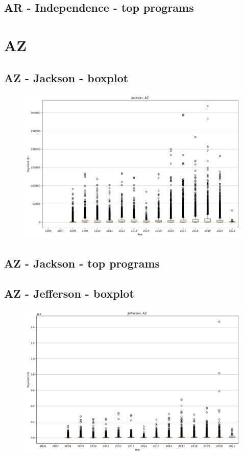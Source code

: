 \subsection*{AR - Independence - top programs}

\newpage
\section*{AZ}
\subsection*{AZ - Jackson - boxplot}
\begin{figure}[h]
\centering
\includegraphics[width=7in]{../output/boxplots/counties/Jackson-AZ_boxplot.png}
\end{figure}


\subsection*{AZ - Jackson - top programs}

\newpage
\subsection*{AZ - Jefferson - boxplot}
\begin{figure}[h]
\centering
\includegraphics[width=7in]{../output/boxplots/counties/Jefferson-AZ_boxplot.png}
\end{figure}


